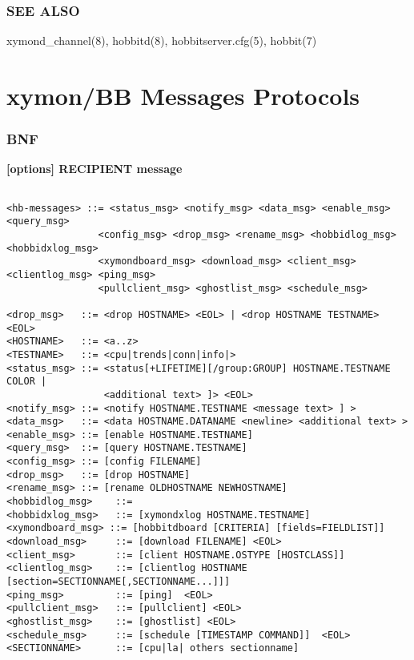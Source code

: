 \subsection{SEE ALSO}
xymond\_channel(8), hobbitd(8), hobbitserver.cfg(5), hobbit(7) 

 

%

\chapter{xymon/BB Messages Protocols}

%
\newpage


\subsection{BNF}
\textbf{ [options] RECIPIENT message}

\begin{verbatim}

<hb-messages> ::= <status_msg> <notify_msg> <data_msg> <enable_msg> <query_msg> 
                <config_msg> <drop_msg> <rename_msg> <hobbidlog_msg> <hobbidxlog_msg> 
                <xymondboard_msg> <download_msg> <client_msg> <clientlog_msg> <ping_msg> 
                <pullclient_msg> <ghostlist_msg> <schedule_msg>

<drop_msg>   ::= <drop HOSTNAME> <EOL> | <drop HOSTNAME TESTNAME> <EOL>
<HOSTNAME>   ::= <a..z> 
<TESTNAME>   ::= <cpu|trends|conn|info|> 
<status_msg> ::= <status[+LIFETIME][/group:GROUP] HOSTNAME.TESTNAME COLOR |
                 <additional text> ]> <EOL>
<notify_msg> ::= <notify HOSTNAME.TESTNAME <message text> ] >
<data_msg>   ::= <data HOSTNAME.DATANAME <newline> <additional text> >
<enable_msg> ::= [enable HOSTNAME.TESTNAME]
<query_msg>  ::= [query HOSTNAME.TESTNAME]
<config_msg> ::= [config FILENAME]
<drop_msg>   ::= [drop HOSTNAME]
<rename_msg> ::= [rename OLDHOSTNAME NEWHOSTNAME]
<hobbidlog_msg>    ::= 
<hobbidxlog_msg>   ::= [xymondxlog HOSTNAME.TESTNAME]
<xymondboard_msg> ::= [hobbitdboard [CRITERIA] [fields=FIELDLIST]]
<download_msg>     ::= [download FILENAME] <EOL>
<client_msg>       ::= [client HOSTNAME.OSTYPE [HOSTCLASS]]
<clientlog_msg>    ::= [clientlog HOSTNAME [section=SECTIONNAME[,SECTIONNAME...]]]
<ping_msg>         ::= [ping]  <EOL>
<pullclient_msg>   ::= [pullclient] <EOL>
<ghostlist_msg>    ::= [ghostlist] <EOL>
<schedule_msg>     ::= [schedule [TIMESTAMP COMMAND]]  <EOL>
<SECTIONNAME>      ::= [cpu|la| others sectionname]

\end{verbatim}

